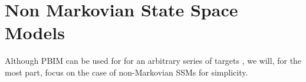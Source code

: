 
\section{Non Markovian State Space Models}
\label{sec:part:ssms}

Although PBIM can be used for for an arbitrary series of targets \citep{naesseth2014sequential,wood2014new}, 
we will, for the most part, focus on the case of non-Markovian \glspl{SSM} for simplicity.